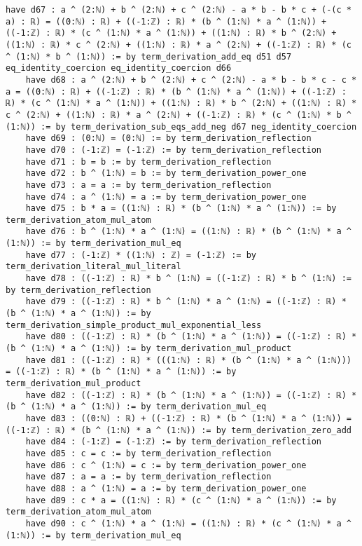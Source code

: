 \documentclass{article}
\begin{document}
\begin{tcolorbox}[colback=white!10, width=\linewidth]
\begin{lstlisting}[language=Lean4]
    have d67 : a ^ (2:ℕ) + b ^ (2:ℕ) + c ^ (2:ℕ) - a * b - b * c + (-(c * a) : ℝ) = ((0:ℕ) : ℝ) + ((-1:ℤ) : ℝ) * (b ^ (1:ℕ) * a ^ (1:ℕ)) + ((-1:ℤ) : ℝ) * (c ^ (1:ℕ) * a ^ (1:ℕ)) + ((1:ℕ) : ℝ) * b ^ (2:ℕ) + ((1:ℕ) : ℝ) * c ^ (2:ℕ) + ((1:ℕ) : ℝ) * a ^ (2:ℕ) + ((-1:ℤ) : ℝ) * (c ^ (1:ℕ) * b ^ (1:ℕ)) := by term_derivation_add_eq d51 d57 eq_identity_coercion eq_identity_coercion d66
    have d68 : a ^ (2:ℕ) + b ^ (2:ℕ) + c ^ (2:ℕ) - a * b - b * c - c * a = ((0:ℕ) : ℝ) + ((-1:ℤ) : ℝ) * (b ^ (1:ℕ) * a ^ (1:ℕ)) + ((-1:ℤ) : ℝ) * (c ^ (1:ℕ) * a ^ (1:ℕ)) + ((1:ℕ) : ℝ) * b ^ (2:ℕ) + ((1:ℕ) : ℝ) * c ^ (2:ℕ) + ((1:ℕ) : ℝ) * a ^ (2:ℕ) + ((-1:ℤ) : ℝ) * (c ^ (1:ℕ) * b ^ (1:ℕ)) := by term_derivation_sub_eqs_add_neg d67 neg_identity_coercion
    have d69 : (0:ℕ) = (0:ℕ) := by term_derivation_reflection
    have d70 : (-1:ℤ) = (-1:ℤ) := by term_derivation_reflection
    have d71 : b = b := by term_derivation_reflection
    have d72 : b ^ (1:ℕ) = b := by term_derivation_power_one
    have d73 : a = a := by term_derivation_reflection
    have d74 : a ^ (1:ℕ) = a := by term_derivation_power_one
    have d75 : b * a = ((1:ℕ) : ℝ) * (b ^ (1:ℕ) * a ^ (1:ℕ)) := by term_derivation_atom_mul_atom
    have d76 : b ^ (1:ℕ) * a ^ (1:ℕ) = ((1:ℕ) : ℝ) * (b ^ (1:ℕ) * a ^ (1:ℕ)) := by term_derivation_mul_eq
    have d77 : (-1:ℤ) * ((1:ℕ) : ℤ) = (-1:ℤ) := by term_derivation_literal_mul_literal
    have d78 : ((-1:ℤ) : ℝ) * b ^ (1:ℕ) = ((-1:ℤ) : ℝ) * b ^ (1:ℕ) := by term_derivation_reflection
    have d79 : ((-1:ℤ) : ℝ) * b ^ (1:ℕ) * a ^ (1:ℕ) = ((-1:ℤ) : ℝ) * (b ^ (1:ℕ) * a ^ (1:ℕ)) := by term_derivation_simple_product_mul_exponential_less
    have d80 : ((-1:ℤ) : ℝ) * (b ^ (1:ℕ) * a ^ (1:ℕ)) = ((-1:ℤ) : ℝ) * (b ^ (1:ℕ) * a ^ (1:ℕ)) := by term_derivation_mul_product
    have d81 : ((-1:ℤ) : ℝ) * (((1:ℕ) : ℝ) * (b ^ (1:ℕ) * a ^ (1:ℕ))) = ((-1:ℤ) : ℝ) * (b ^ (1:ℕ) * a ^ (1:ℕ)) := by term_derivation_mul_product
    have d82 : ((-1:ℤ) : ℝ) * (b ^ (1:ℕ) * a ^ (1:ℕ)) = ((-1:ℤ) : ℝ) * (b ^ (1:ℕ) * a ^ (1:ℕ)) := by term_derivation_mul_eq
    have d83 : ((0:ℕ) : ℝ) + ((-1:ℤ) : ℝ) * (b ^ (1:ℕ) * a ^ (1:ℕ)) = ((-1:ℤ) : ℝ) * (b ^ (1:ℕ) * a ^ (1:ℕ)) := by term_derivation_zero_add
    have d84 : (-1:ℤ) = (-1:ℤ) := by term_derivation_reflection
    have d85 : c = c := by term_derivation_reflection
    have d86 : c ^ (1:ℕ) = c := by term_derivation_power_one
    have d87 : a = a := by term_derivation_reflection
    have d88 : a ^ (1:ℕ) = a := by term_derivation_power_one
    have d89 : c * a = ((1:ℕ) : ℝ) * (c ^ (1:ℕ) * a ^ (1:ℕ)) := by term_derivation_atom_mul_atom
    have d90 : c ^ (1:ℕ) * a ^ (1:ℕ) = ((1:ℕ) : ℝ) * (c ^ (1:ℕ) * a ^ (1:ℕ)) := by term_derivation_mul_eq

\end{lstlisting}
\end{tcolorbox}
\end{document}
